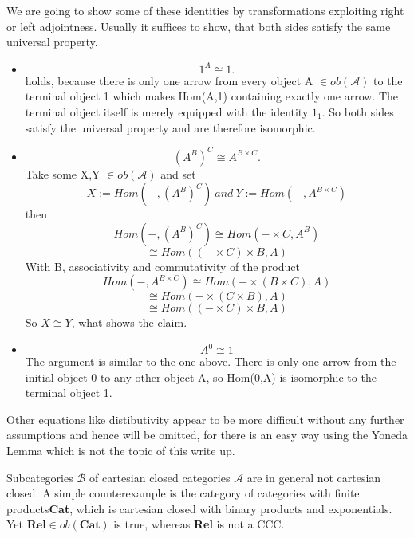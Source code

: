 We are going to show some of these identities by transformations exploiting right or left adjointness.
Usually it suffices to show, that both sides satisfy the same universal property.
\begin{itemize}
\item $$1^A \cong 1.$$
  holds, because there is only one arrow from every object A $\in ob(\mathcal{A})$ to the terminal object 1 which makes Hom(A,1) containing exactly one arrow. The terminal object itself is merely equipped with the identity $1_1$.
  So both sides satisfy the universal property and are therefore isomorphic.
  

\item $$(A^B)^C \cong A^{B \times C}.$$
  Take some X,Y $\in ob(\mathcal{A})$ and set
  $$ X:=Hom(-, (A^B)^C) \ and \ Y:= Hom(-,A^{B \times C})$$
  then
  $$ Hom(-, (A^B)^C) \cong Hom(-\times C, A^B) $$
  $$ \cong Hom((- \times C)\times B,A) $$
  With B, associativity and commutativity of the product
  $$ Hom(-,A^{B\times C}) \cong Hom(- \times (B \times C),A) $$
  $$ \cong Hom(-\times (C\times B),A) $$
  $$ \cong Hom((-\times C)\times B,A) $$
  So $X \cong Y$, what shows the claim.
\item $$A^0 \cong 1$$
  The argument is similar to the one above. There is only one arrow from the initial object 0 to any other object A, so Hom(0,A) is isomorphic to the terminal object 1.
\end{itemize}

Other equations like distibutivity appear to be more difficult without any further assumptions and hence will be omitted, for there is an easy way using the Yoneda Lemma which is not the topic of this write up.


Subcategories $\mathcal{B}$ of cartesian closed categories $\mathcal{A}$ are in general not cartesian closed.
A simple counterexample is the category of categories with finite products\textbf{Cat}, which is cartesian closed with binary products and exponentials. 
Yet $\textbf{Rel} \in ob(\textbf{Cat})$ is true, whereas \textbf{Rel} is not a CCC. 






